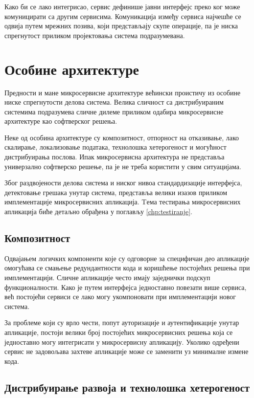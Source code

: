 \documentclass[12pt,oneside]{memoir}
\begin{document}
Како би се лако интегрисао, сервис дефинише јавни интерфејс преко ког може комуницирати са другим сервисима. Комуникација између сервиса најчешће се одвија путем мрежних позива, који представљају скупе операције, па је ниска спрегнутост приликом пројектовања система подразумевана.

\section{Особине архитектуре}

Предности и мане микросервисне архитектуре већински проистичу из особине ниске спрегнутости делова система. Велика сличност са дистрибуираним системима подразумева сличне дилеме приликом одабира микросервисне архитектуре као софтверског решења.

Неке од особина архитектуре су композитност, отпорност на отказивање, лако скалирање, локализовање података, технолошка хетерогеност и могућност дистрибуирања послова. Ипак микросервисна архитектура не представља универзално софтверско решење, па је не треба користити у свим ситуацијама. 

Због раздвојености делова система и ниског нивоа стандардизације интерфејса, детектовање грешака унутар система, представља велики изазов приликом имплементације микросервисних апликација. Tема тестирања микросервисних апликација биће детаљно обрађена у поглављу \ref{chp:testiranje}.

\subsection{Композитност}

Одвајањем логичких компоненти које су одговорне за специфичан део апликације омогућава се смањење редундантности кода и коришћење постојећих решења при имплементацији. Сличне апликације често имају заједнички подскуп функционалности. Како је путем интерфејса једноставно повезати више сервиса, већ постојећи сервиси се лако могу укомпоновати при имплементацији новог система. 

За проблеме који су врло чести, попут ауторизације и аутентификације унутар апликације, постоји велики број постојећих микросервисних решења која се једноставно могу интегрисати у микросервисну апликацију. Уколико одређени сервис не задовољава захтеве апликације може се заменити уз минималне измене кода.

\subsection{Дистрибуирање развоја и технолошка хетерогеност}
\end{document}
